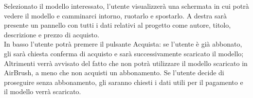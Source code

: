 \documentclass[11pt,fleqn]{book} %
\begin{document}
\begin{itemize}
Selezionato il modello interessato, l'utente visualizzerà una schermata in cui potrà vedere il modello e camminarci intorno, ruotarlo e spostarlo. A destra sarà presente un pannello con tutti i dati relativi al progetto come autore, titolo, descrizione e prezzo di acquisto.\\
In basso l'utente potrà premere il pulsante Acquista: se l'utente è già abbonato, gli sarà chiesta conferma di acquisto e sarà successivamente scaricato il modello; Altrimenti verrà avvisato del fatto che non potrà utilizzare il modello scaricato in AirBrush, a meno che non acquisti un abbonamento. Se l'utente decide di proseguire senza abbonamento, gli saranno chiesti i dati utili per il pagamento e il modello verrà scaricato.
\end{itemize}




\newpage
    
    
    
    
    
    
    
    
\end{document}
